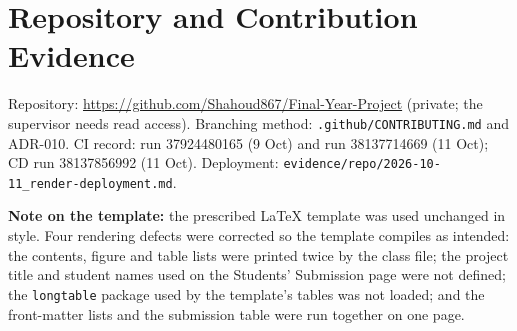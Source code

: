 \chapter{Repository and Contribution Evidence}

Repository: \url{https://github.com/Shahoud867/Final-Year-Project} (private; the supervisor needs read access). Branching method: \texttt{.\allowbreak{}github/\allowbreak{}CONTRIBUTING.\allowbreak{}md} and ADR-010. CI record: run 37924480165 (9 Oct) and run 38137714669 (11 Oct); CD run 38137856992 (11 Oct). Deployment: \texttt{evidence/\allowbreak{}repo/\allowbreak{}2026-10-11\_\allowbreak{}render-deployment.\allowbreak{}md}.

\textbf{Note on the template:} the prescribed LaTeX template was used unchanged in style. Four rendering defects were corrected so the template compiles as intended: the contents, figure and table lists were printed twice by the class file; the project title and student names used on the Students' Submission page were not defined; the \texttt{longtable} package used by the template's tables was not loaded; and the front-matter lists and the submission table were run together on one page.
